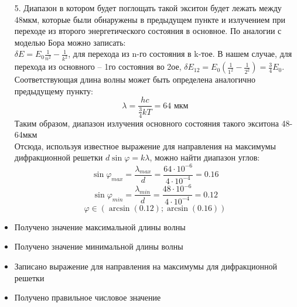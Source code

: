\documentclass[a4paper, 12pt, oneside]{book}
\begin{document}
\begin{enumerate}
\item[5.] Диапазон в котором будет поглощать такой экситон будет лежать между 48мкм, которые были обнаружены в предыдущем пункте и излучением при переходе из второго энергетического состояния в основное. По аналогии с моделью Бора можно записать:\\
$\delta E=E_0\frac{1}{n^2}-\frac{1}{k^2}$, для перехода из n-го состояния в k-тое. В нашем случае, для перехода из основного – 1го состояния во 2ое, $\delta E_12=E_0\left(\frac{1}{1^2}-\frac{1}{2^2}\right)=\frac{3}{4}E_0$.\\
Соответствующая длина волны может быть определена аналогично предыдущему пункту:\\
$$\lambda=\frac{hc}{\frac{3}{4}kT}=64\text{ мкм}$$
Таким образом, диапазон излучения основного состояния такого экситона 48-64мкм\\
Отсюда, используя известное выражение для направления на максимумы дифракционной решетки $d\sin\varphi=k\lambda$, можно найти диапазон углов:
$$\sin\varphi_{max}=\frac{\lambda_{max}}{d}=\frac{64\cdot10^{-6}}{4\cdot10^{-4}}=0.16$$					
$$\sin\varphi_{min}=\frac{\lambda_{min}}{d}=\frac{48\cdot10^{-6}}{4\cdot10^{-4}}=0.12$$
$$\varphi\in(\arcsin(0.12);\arcsin(0.16))$$
\end{enumerate}
\additionalCriteria
\begin{itemize}
\item Получено значение максимальной длины волны
\item Получено значение минимальной длины волны
\item Записано выражение для направления на максимумы для дифракционной решетки
\item Получено правильное числовое значение
\end{itemize}
\end{document}
